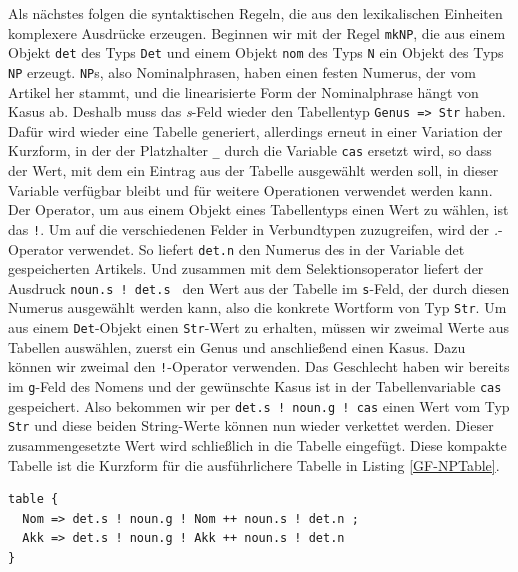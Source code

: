 Als nächstes folgen die syntaktischen Regeln, die aus den lexikalischen Einheiten komplexere Ausdrücke erzeugen. Beginnen wir mit der Regel \texttt{mkNP}, die aus einem Objekt \texttt{det} des Typs \texttt{Det} und einem Objekt \texttt{nom} des Typs \texttt{N} ein Objekt des Typs \texttt{NP} erzeugt. \texttt{NP}s, also Nominalphrasen, haben einen festen Numerus, der vom Artikel her stammt, und die linearisierte Form der Nominalphrase hängt von Kasus ab. Deshalb muss das \textit{s}-Feld wieder den Tabellentyp \texttt{Genus => Str} haben. Dafür wird wieder eine Tabelle generiert, allerdings erneut in einer Variation der Kurzform, in der der Platzhalter \texttt{\_} durch die Variable \texttt{cas} ersetzt wird, so dass der Wert, mit dem ein Eintrag aus der Tabelle ausgewählt werden soll, in dieser Variable verfügbar bleibt und für weitere Operationen verwendet werden kann. Der Operator, um aus einem Objekt eines Tabellentyps einen Wert zu wählen, ist das \texttt{!}. Um auf die verschiedenen Felder in Verbundtypen zuzugreifen, wird der \textit{.}-Operator verwendet. So liefert \texttt{det.n} den Numerus des in der Variable det gespeicherten Artikels. Und zusammen mit dem Selektionsoperator liefert der Ausdruck \texttt{noun.s ! det.s } den Wert aus der Tabelle im \texttt{s}-Feld, der durch diesen Numerus ausgewählt werden kann, also die konkrete Wortform von Typ \texttt{Str}. Um aus einem \texttt{Det}-Objekt einen \texttt{Str}-Wert zu erhalten, müssen wir zweimal Werte aus Tabellen auswählen, zuerst ein Genus und anschließend einen Kasus. Dazu können wir zweimal den \texttt{!}-Operator verwenden. Das Geschlecht haben wir bereits im \texttt{g}-Feld des Nomens und der gewünschte Kasus ist in der Tabellenvariable \texttt{cas} gespeichert. Also bekommen wir per \texttt{det.s ! noun.g ! cas} einen Wert vom Typ \texttt{Str} und diese beiden String-Werte können nun wieder verkettet werden. Dieser zusammengesetzte Wert wird schließlich in die Tabelle eingefügt. Diese kompakte Tabelle ist die Kurzform für die ausführlichere Tabelle in Listing \ref{GF-NPTable}. \par
\begin{lstlisting}[float=h!tp,caption={Ausführliche Form der Tabelle in Zeile 13 des Listings \ref{GF-SatzGer}},label={GF-NPTable}]
table { 
  Nom => det.s ! noun.g ! Nom ++ noun.s ! det.n ; 
  Akk => det.s ! noun.g ! Akk ++ noun.s ! det.n 
}
\end{lstlisting}
